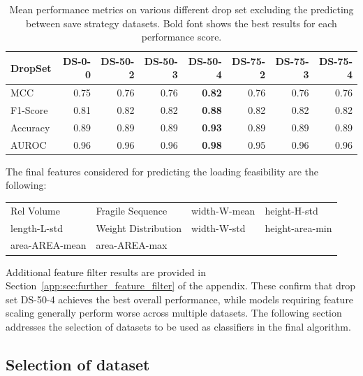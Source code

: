 \begin{table}[ht]
	\centering
	\small
	\begin{tabular}{lrrrrrrr}
		\toprule
		DropSet  & DS-0-0 & DS-50-2 & DS-50-3 & DS-50-4       & DS-75-2 & DS-75-3 & DS-75-4 \\
		\midrule
		MCC      & 0.75   & 0.76    & 0.76    & \textbf{0.82} & 0.76    & 0.76    & 0.76    \\
		F1-Score & 0.81   & 0.82    & 0.82    & \textbf{0.88} & 0.82    & 0.82    & 0.82    \\
		Accuracy & 0.89   & 0.89    & 0.89    & \textbf{0.93} & 0.89    & 0.89    & 0.89    \\
		AUROC    & 0.96   & 0.96    & 0.96    & \textbf{0.98} & 0.95    & 0.96    & 0.96    \\
		\bottomrule
	\end{tabular}
	\caption[Mean performance metrics on various different drop set excluding the predicting between save strategy datasets.]
	{Mean performance metrics on various different drop set excluding the predicting between save strategy datasets.
		Bold font shows the best results for each performance score.}
	\label{tab:featurePerformance_Alldata}
\end{table}

The final features considered for predicting the loading feasibility are the following:
\begin{table}[!ht]
	\centering
	\def\arraystretch{1.5}
	\begin{tabular}{l l l l }
		\sbt Rel Volume      & \sbt Fragile Sequence    & \sbt width-W-mean & \sbt height-H-std    \\
		\sbt  length-L-std   & \sbt Weight Distribution & \sbt width-W-std  & \sbt height-area-min \\
		\sbt  area-AREA-mean & \sbt area-AREA-max       &                   &                      \\
	\end{tabular}
\end{table}

Additional feature filter results are provided in Section~\ref{app:sec:further_feature_filter} of the appendix.
These confirm that drop set DS-50-4 achieves the best overall performance, while models requiring feature scaling generally perform worse
across multiple datasets. The following section addresses the selection of datasets to be used as classifiers in the final algorithm.

\subsection{Selection of dataset}
\label{sec:dataset_selection}

